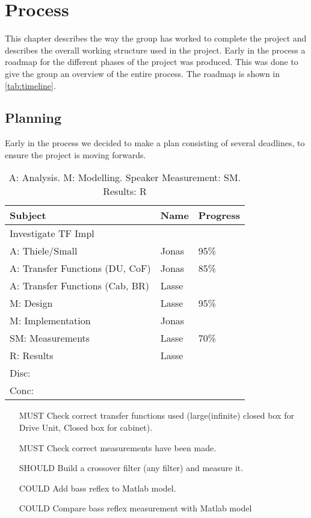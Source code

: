 
\chapter{Process}
This chapter describes the way the group has worked to complete the project and describes the overall working structure used in the project.
Early in the process a roadmap for the different phases of the project was produced. This was done to give the group an overview of the entire process. The roadmap is shown in \cref{tab:timeline}.

\section{Planning}
Early in the process we decided to make a plan consisting of several deadlines, to ensure the project is moving forwards.

\begin{table}
	\begin{tabularx}{\textwidth}{l X X}
		\toprule
		\textbf{Subject} & \textbf{Name} & \textbf{Progress} \\
		\midrule
		Investigate TF Impl & & \\
		A: Thiele/Small & Jonas & 95\% \\
		A: Transfer Functions (DU, CoF) & Jonas & 85\%\\
		A: Transfer Functions (Cab, BR) & Lasse & \\
		M: Design & Lasse & 95\% \\
		M: Implementation & Jonas & \\
		SM: Measurements & Lasse & 70\% \\
		R: Results & Lasse & \\
		Disc: & & \\
		Conc: & & \\
		\bottomrule
	\end{tabularx}
	\caption{A: Analysis. M: Modelling. Speaker Measurement: SM. Results: R}
\end{table}

\begin{itemize}
	\item[MUST] Check correct transfer functions used (large(infinite) closed box for Drive Unit, Closed box for cabinet).
	\item[MUST] Check correct measurements have been made.
	\item[SHOULD] Build a crossover filter (any filter) and measure it.
	\item[COULD] Add bass reflex to Matlab model.
	\item[COULD] Compare bass reflex measurement with Matlab model
\end{itemize}